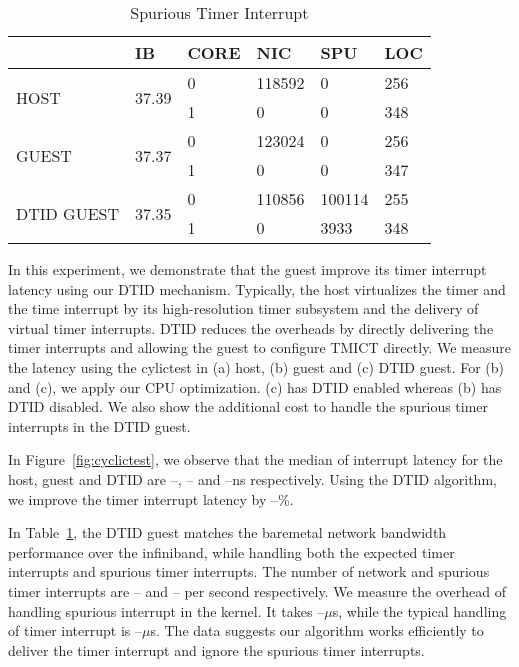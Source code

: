 

\begin{table}[]
\begin{tabular}{|l|l|l|l|l|l|}
\hline
& IB & CORE & NIC & SPU & LOC \\ \hline
\multirow{2}{*}{HOST} & \multirow{2}{*}{37.39} & 0 & 118592 & 0 & 256 \\ \cline{3-6} 
&  & 1 & 0 & 0 & 348 \\ \hline
\multirow{2}{*}{GUEST} & \multirow{2}{*}{37.37} & 0 & 123024 & 0 & 256 \\ \cline{3-6} 
&  & 1 & 0 & 0 & 347 \\ \hline
\multirow{2}{*}{DTID GUEST} & \multirow{2}{*}{37.35} & 0 & 110856 & 100114 & 255 \\ \cline{3-6} 
&  & 1 & 0 & 3933 & 348 \\ \hline
\end{tabular}
\caption{Spurious Timer Interrupt}
\label{tab:spurious_timer_interrupt}
\end{table}

In this experiment, we demonstrate that the guest improve its
timer interrupt latency using our DTID mechanism. Typically,
the host virtualizes the timer and the time interrupt by its
high-resolution timer subsystem and the delivery of virtual
timer interrupts. DTID reduces the overheads by directly
delivering the timer interrupts and allowing the guest to
configure TMICT directly. We measure the latency using the
cylictest in (a) host, (b) guest and (c) DTID guest. For (b)
and (c), we apply our CPU optimization. (c) has DTID enabled
whereas (b) has DTID disabled. We also show the additional
cost to handle the spurious timer interrupts in the DTID
guest.

In Figure~\ref{fig:cyclictest}, we observe that the median of
interrupt latency for the host, guest and DTID are --, -- and
--ns respectively. Using the DTID algorithm, we improve the
timer interrupt latency by --\%.

In Table~\ref{tab:spurious_timer_interrupt}, the DTID guest
matches the baremetal network bandwidth performance over the
infiniband, while handling both the expected timer interrupts
and spurious timer interrupts. The number of network and
spurious timer interrupts are -- and -- per second
respectively. We measure the overhead of handling spurious
interrupt in the kernel. It takes --$\mu$s, while the typical
handling of timer interrupt is --$\mu$s. The data suggests our
algorithm works efficiently to deliver the timer interrupt and
ignore the spurious timer interrupts.
